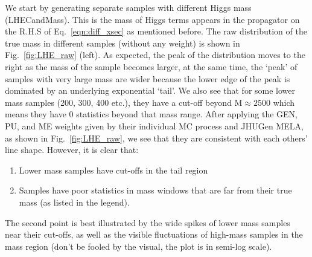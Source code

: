 We start by generating separate samples with different Higgs mass (LHECandMass).
This is the mass of Higgs terms appears in the propagator on 
the R.H.S of Eq.~\ref{eqn:diff_xsec} as mentioned before. The raw distribution of the true mass
in different samples (without any weight) is shown in Fig.~\ref{fig:LHE_raw} (left). As expected, 
the peak of the distribution moves to the right as the mass of the sample becomes larger, at the
same time, the `peak' of samples with very large mass are wider because the lower edge
of the peak is dominated by an underlying exponential `tail'. We also see that for some lower mass
samples (200, 300, 400 etc.), they have a cut-off beyond $\mathrm{M}\approx2500$ which means they have 0
statistics beyond that mass range. After applying the GEN, PU, and ME weights given by their
individual MC process and JHUGen MELA, as shown in Fig.~\ref{fig:LHE_raw},
we see that they are consistent with each others' line shape. However, it is clear
that:
\begin{enumerate}[label=(\roman*)]
    \item Lower mass samples have cut-offs in the tail region
    \item Samples have poor statistics in mass windows that are 
        far from their true mass (as listed in the legend).
\end{enumerate}
The second point is best illustrated by the wide spikes of lower mass samples near their cut-offs,
as well as the visible fluctuations of high-mass samples in the mass region (don't be fooled by the 
visual, the plot is in semi-log scale).
